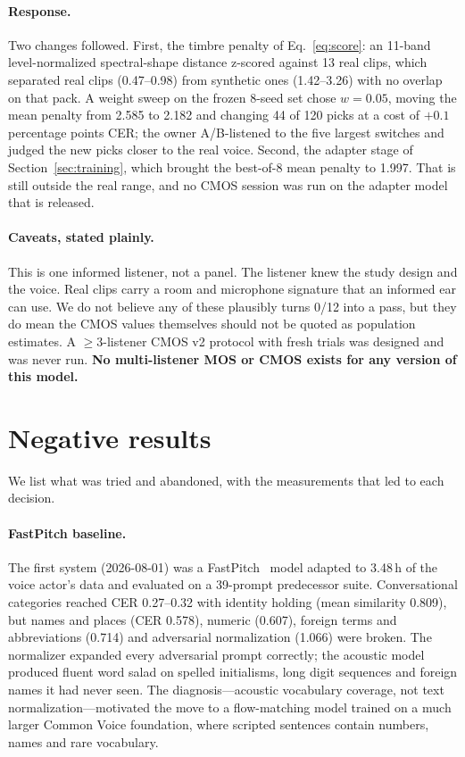 \documentclass[10pt,twocolumn]{article}
\begin{document}
\paragraph{Response.} Two changes followed. First, the timbre penalty of Eq.~\eqref{eq:score}: an 11-band level-normalized spectral-shape distance z-scored against 13 real clips, which separated real clips (0.47--0.98) from synthetic ones (1.42--3.26) with no overlap on that pack. A weight sweep on the frozen 8-seed set chose $w=0.05$, moving the mean penalty from 2.585 to 2.182 and changing 44 of 120 picks at a cost of $+0.1$ percentage points CER; the owner A/B-listened to the five largest switches and judged the new picks closer to the real voice. Second, the adapter stage of Section~\ref{sec:training}, which brought the best-of-8 mean penalty to 1.997. That is still outside the real range, and no CMOS session was run on the adapter model that is released.

\paragraph{Caveats, stated plainly.} This is one informed listener, not a panel. The listener knew the study design and the voice. Real clips carry a room and microphone signature that an informed ear can use. We do not believe any of these plausibly turns 0/12 into a pass, but they do mean the CMOS values themselves should not be quoted as population estimates. A $\ge$3-listener CMOS v2 protocol with fresh trials was designed and was never run. \textbf{No multi-listener MOS or CMOS exists for any version of this model.}

\section{Negative results}
\label{sec:negative}

We list what was tried and abandoned, with the measurements that led to each decision.

\paragraph{FastPitch baseline.} The first system (2026-08-01) was a FastPitch~\citep{lancucki2021fastpitch} model adapted to 3.48\,h of the voice actor's data and evaluated on a 39-prompt predecessor suite. Conversational categories reached CER 0.27--0.32 with identity holding (mean similarity 0.809), but names and places (CER 0.578), numeric (0.607), foreign terms and abbreviations (0.714) and adversarial normalization (1.066) were broken. The normalizer expanded every adversarial prompt correctly; the acoustic model produced fluent word salad on spelled initialisms, long digit sequences and foreign names it had never seen. The diagnosis---acoustic vocabulary coverage, not text normalization---motivated the move to a flow-matching model trained on a much larger Common Voice foundation, where scripted sentences contain numbers, names and rare vocabulary.
\end{document}
